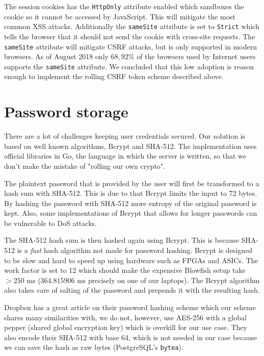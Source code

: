 \documentclass[12pt,a4paper]{report}
\begin{document}
The session cookies has the \texttt{HttpOnly} attribute enabled which sandboxes the cookie so it cannot be accessed by JavaScript. This will mitigate the most common XSS attacks\cite{owasp-httponly}. Additionally the \texttt{sameSite} attribute is set to \texttt{Strict} which tells the browser that it should not send the cookie with cross-site requests\cite{owasp-samesite}. The \texttt{sameSite} attribute will mitigate CSRF attacks, but is only supported in modern browsers. As of August 2018 only $68,92 \%$ of the browsers used by Internet users supports the \texttt{sameSite} attribute\cite{owasp-samesite-support}. We concluded that this low adoption is reason enough to implement the rolling CSRF token scheme described above.

\section{Password storage}
There are a lot of challenges keeping user credentials secured. Our solution is based on well known algorithms, Bcrypt and SHA-512. The implementation uses official libraries in Go, the language in which the server is written, so that we don't make the mistake of "rolling our own crypto".

The plaintext password that is provided by the user will first be transformed to a hash sum with SHA-512. This is due to that Bcrypt limits the input to 72 bytes. By hashing the password with SHA-512 more entropy of the original password is kept. Also, some implementations of Bcrypt that allows for longer passwords can be vulnerable to DoS attacks\cite{bcrypt-length}.

The SHA-512 hash sum is then hashed again using Bcrypt. This is because
SHA-512 is a \textit{fast} hash algorithm not made for password hashing. Bcrypt is
designed to be slow and hard to speed up using hardware such as FPGAs and
ASICs. The work factor is set to 12 which should make the expensive Blowfish
setup take $> 250$ ms ($364.815906$ ms precisely on one of our laptops).
The Bcrypt algorithm also takes care of salting of the password and prepends 
it with the resulting hash.

Dropbox has a great article\cite{dropbox-passwords} on their password hashing scheme which our
scheme shares many similarities with, we do not, however, use AES-256 with a
global pepper (shared global encryption key) which is overkill for our use
case. They also encode their SHA-512 with base 64, which is not needed in our
case because we can save the hash as raw bytes (PostgreSQL's \texttt{bytea}).
\end{document}
